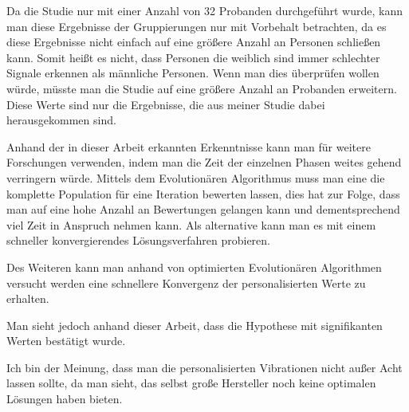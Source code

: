 Da die Studie nur mit einer Anzahl von 32 Probanden durchgef{\"u}hrt wurde, kann man diese Ergebnisse der Gruppierungen nur mit Vorbehalt betrachten, da es diese Ergebnisse nicht einfach auf eine gr{\"o}{\ss}ere Anzahl an Personen schlie{\ss}en kann. 
Somit hei{\ss}t es nicht, dass Personen die weiblich sind immer schlechter Signale erkennen als m{\"a}nnliche Personen. 
Wenn man dies {\"u}berpr{\"u}fen wollen w{\"u}rde, m{\"u}sste man die Studie auf eine gr{\"o}{\ss}ere Anzahl an Probanden erweitern. 
Diese Werte sind nur die Ergebnisse, die aus meiner Studie dabei herausgekommen sind.

Anhand der in dieser Arbeit erkannten Erkenntnisse kann man f{\"u}r weitere Forschungen verwenden, indem man die Zeit der einzelnen Phasen weites gehend verringern w{\"u}rde. 
Mittels dem Evolution{\"a}ren Algorithmus muss man eine die komplette Population f{\"u}r eine Iteration bewerten lassen, dies hat zur Folge, dass man auf eine hohe Anzahl an Bewertungen gelangen kann und dementsprechend viel Zeit in Anspruch nehmen kann.
Als alternative kann man es mit einem schneller konvergierendes L{\"o}sungsverfahren probieren. 

Des Weiteren kann man anhand von optimierten Evolution{\"a}ren Algorithmen versucht werden eine schnellere Konvergenz der personalisierten Werte zu erhalten. 

Man sieht jedoch anhand dieser Arbeit, dass die Hypothese mit signifikanten Werten best{\"a}tigt wurde.

Ich bin der Meinung, dass man die personalisierten Vibrationen nicht au{\ss}er Acht lassen sollte, da man sieht, das selbst gro{\ss}e Hersteller noch keine optimalen L{\"o}sungen haben bieten. 



